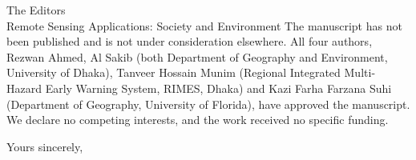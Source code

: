 \documentclass[10pt]{letter}
\begin{document}
\begin{letter}{The Editors\\Remote Sensing Applications: Society and Environment}
The manuscript has not been published and is not under consideration elsewhere. All four authors, Rezwan Ahmed, Al Sakib (both Department of Geography and Environment, University of Dhaka), Tanveer Hossain Munim (Regional Integrated Multi-Hazard Early Warning System, RIMES, Dhaka) and Kazi Farha Farzana Suhi (Department of Geography, University of Florida), have approved the manuscript. We declare no competing interests, and the work received no specific funding.

\closing{Yours sincerely,}
\end{letter}
\end{document}
